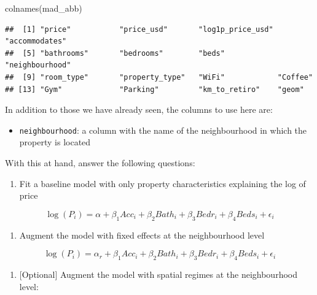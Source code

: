 \documentclass[
]{book}
\newenvironment{Shaded}{\begin{snugshade}}{\end{snugshade}}
\newcommand{\FunctionTok}[1]{\textcolor[rgb]{0.00,0.00,0.00}{#1}}
\newcommand{\NormalTok}[1]{#1}
\providecommand{\tightlist}{%
  \setlength{\itemsep}{0pt}\setlength{\parskip}{0pt}}
\begin{document}
\begin{Shaded}
\begin{Highlighting}[]
\FunctionTok{colnames}\NormalTok{(mad\_abb)}
\end{Highlighting}
\end{Shaded}

\begin{verbatim}
##  [1] "price"           "price_usd"       "log1p_price_usd" "accommodates"   
##  [5] "bathrooms"       "bedrooms"        "beds"            "neighbourhood"  
##  [9] "room_type"       "property_type"   "WiFi"            "Coffee"         
## [13] "Gym"             "Parking"         "km_to_retiro"    "geom"
\end{verbatim}

In addition to those we have already seen, the columns to use here are:

\begin{itemize}
\tightlist
\item
  \texttt{neighbourhood}: a column with the name of the neighbourhood in which the property is located
\end{itemize}

With this at hand, answer the following questions:

\begin{enumerate}
\def\labelenumi{\arabic{enumi}.}
\tightlist
\item
  Fit a baseline model with only property characteristics explaining the log of price
\end{enumerate}

\[
\log(P_i) = \alpha + \beta_1 Acc_i + \beta_2 Bath_i + \beta_3 Bedr_i + \beta_4 Beds_i + \epsilon_i
\]

\begin{enumerate}
\def\labelenumi{\arabic{enumi}.}
\setcounter{enumi}{1}
\tightlist
\item
  Augment the model with fixed effects at the neighbourhood level
\end{enumerate}

\[
\log(P_i) = \alpha_r + \beta_1 Acc_i + \beta_2 Bath_i + \beta_3 Bedr_i + \beta_4 Beds_i + \epsilon_i
\]

\begin{enumerate}
\def\labelenumi{\arabic{enumi}.}
\setcounter{enumi}{2}
\tightlist
\item
  {[}Optional{]} Augment the model with spatial regimes at the neighbourhood level:
\end{enumerate}
\end{document}
